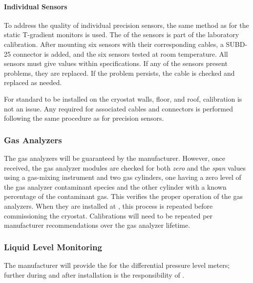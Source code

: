 \paragraph{Individual Sensors}
\label{sec:fdgen-slow-cryo-qc-is}

To address the quality of individual precision sensors, the same method as for the static T-gradient monitors %
is used.
The  of the sensors is part of the laboratory calibration. After mounting six sensors with their corresponding cables, a
SUBD-25 connector %
is added, and the six sensors tested at room temperature. All sensors %
must %
give values within specifications.  
If any of the sensors present problems, they are replaced.  If the problem persists, the cable is checked and replaced as needed.

For standard  to be installed on the cryostat walls, floor, and roof, calibration is not an issue. Any  required for associated cables and connectors %
is performed following the same procedure as for precision sensors. 

\subsubsection{Gas Analyzers}
\label{sec:fdgen-slow-cryo-qc-ga}


The gas analyzers will be guaranteed by the manufacturer. However, once received, the gas analyzer modules %
are checked for both \textit{zero} and the \textit{span} values using a gas-mixing instrument and two gas cylinders, one having a zero level of the gas analyzer contaminant species and the other cylinder with a known percentage of the contaminant gas. This %
 verifies the proper operation of the gas analyzers. When they are installed at \surf, this process %
 is repeated before commissioning the cryostat. Calibrations will need to be repeated %
 per manufacturer recommendations over the gas analyzer lifetime.


\subsubsection{Liquid Level Monitoring}
\label{sec:fdgen-slow-cryo-qc-llm}

The manufacturer will provide the  for the differential pressure level meters; further  during and after installation %
is the responsibility of .

